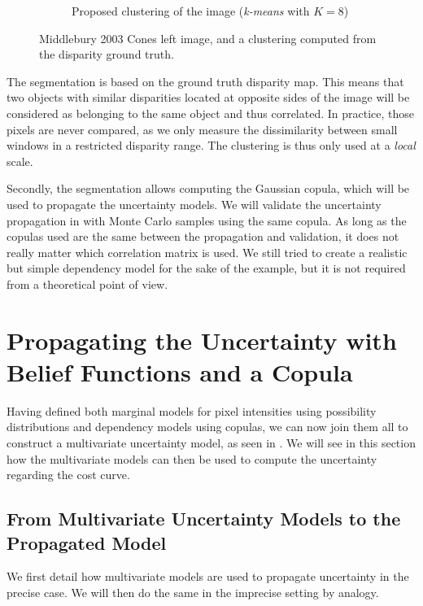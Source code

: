 \begin{figure}
\begin{subfigure}[t]{0.5\linewidth}
        \caption{Proposed clustering of the image (\textit{k-means} with $K=8$)}
        \label{fig:cluster}
    \end{subfigure}
    \caption{Middlebury 2003 Cones left image, and a clustering computed from the disparity ground truth.}
    \label{fig:clustering_example}
\end{figure}

\begin{remark}
    The segmentation is based on the ground truth disparity map. This means that two objects with similar disparities located at opposite sides of the image will be considered as belonging to the same object and thus correlated. In practice, those pixels are never compared, as we only measure the dissimilarity between small windows in a restricted disparity range. The clustering is thus only used at a \textit{local} scale. 
    
    Secondly, the segmentation allows computing the Gaussian copula, which will be used to propagate the uncertainty models. We will validate the uncertainty propagation in  with Monte Carlo samples using the same copula. As long as the copulas used are the same between the propagation and validation, it does not really matter which correlation matrix is used. We still tried to create a realistic but simple dependency model for the sake of the example, but it is not required from a theoretical point of view.
\end{remark}

\section{Propagating the Uncertainty with Belief Functions and a Copula}
Having defined both marginal models for pixel intensities using possibility distributions and dependency models using copulas, we can now join them all to construct a multivariate uncertainty model, as seen in . We will see in this section how the multivariate models can then be used to compute the uncertainty regarding the cost curve. 

\subsection{From Multivariate Uncertainty Models to the Propagated Model}
We first detail how multivariate models are used to propagate uncertainty in the precise case. We will then do the same in the imprecise setting by analogy.

